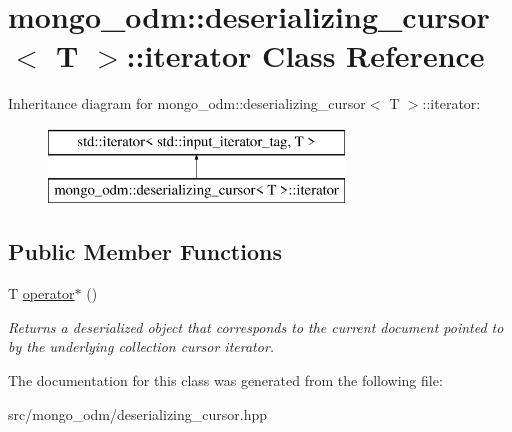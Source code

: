 \hypertarget{classmongo__odm_1_1deserializing__cursor_1_1iterator}{}\section{mongo\+\_\+odm\+:\+:deserializing\+\_\+cursor$<$ T $>$\+:\+:iterator Class Reference}
\label{classmongo__odm_1_1deserializing__cursor_1_1iterator}
Inheritance diagram for mongo\+\_\+odm\+:\+:deserializing\+\_\+cursor$<$ T $>$\+:\+:iterator\+:\begin{figure}[H]
\begin{center}
\leavevmode
\includegraphics[height=2.000000cm]{classmongo__odm_1_1deserializing__cursor_1_1iterator}
\end{center}
\end{figure}
\subsection*{Public Member Functions}
\begin{DoxyCompactItemize}
\item 
T \hyperlink{classmongo__odm_1_1deserializing__cursor_1_1iterator_ad7b8718a44ef73460ed9196c719acaf6}{operator$\ast$} ()\hypertarget{classmongo__odm_1_1deserializing__cursor_1_1iterator_ad7b8718a44ef73460ed9196c719acaf6}{}\label{classmongo__odm_1_1deserializing__cursor_1_1iterator_ad7b8718a44ef73460ed9196c719acaf6}

\begin{DoxyCompactList}\small\item\em Returns a deserialized object that corresponds to the current document pointed to by the underlying collection cursor iterator. \end{DoxyCompactList}\end{DoxyCompactItemize}


The documentation for this class was generated from the following file\+:\begin{DoxyCompactItemize}
\item 
src/mongo\+\_\+odm/deserializing\+\_\+cursor.\+hpp\end{DoxyCompactItemize}
